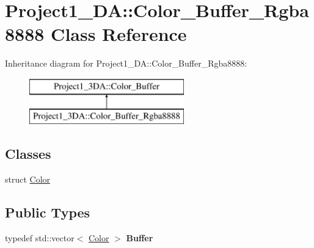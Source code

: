 \hypertarget{class_project1__3_d_a_1_1_color___buffer___rgba8888}{}\section{Project1\+\_\+DA\+::Color\+\_\+\+Buffer\+\_\+\+Rgba8888 Class Reference}
\label{class_project1__3_d_a_1_1_color___buffer___rgba8888}
Inheritance diagram for Project1\+\_\+DA\+::Color\+\_\+\+Buffer\+\_\+\+Rgba8888\+:\begin{figure}[H]
\begin{center}
\leavevmode
\includegraphics[height=2.000000cm]{class_project1__3_d_a_1_1_color___buffer___rgba8888}
\end{center}
\end{figure}
\subsection*{Classes}
\begin{DoxyCompactItemize}
\item 
struct \mbox{\hyperlink{struct_project1__3_d_a_1_1_color___buffer___rgba8888_1_1_color}{Color}}
\end{DoxyCompactItemize}
\subsection*{Public Types}
\begin{DoxyCompactItemize}
\item 
\mbox{\label{class_project1__3_d_a_1_1_color___buffer___rgba8888_ad72cd658cbe64509be74db92aae99837}} 
typedef std\+::vector$<$ \mbox{\hyperlink{struct_project1__3_d_a_1_1_color___buffer___rgba8888_1_1_color}{Color}} $>$ {\bfseries Buffer}
\end{DoxyCompactItemize}

